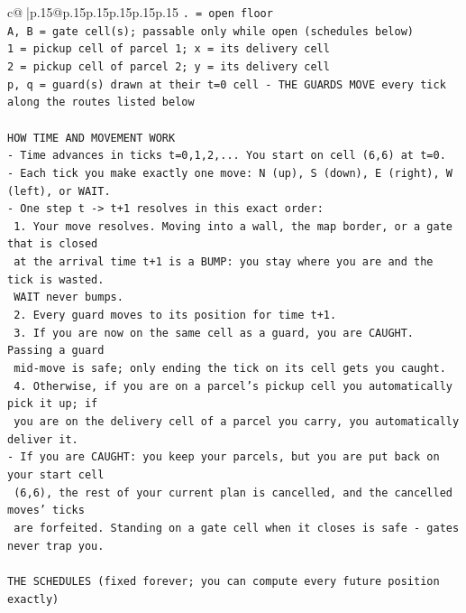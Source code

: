 \documentclass{article}
\begin{document}
{\begin{supertabular}{c@{$\;$}|p{.15\linewidth}@{}p{.15\linewidth}p{.15\linewidth}p{.15\linewidth}p{.15\linewidth}p{.15\linewidth}}
{{{\texttt{. = open floor} \\
\texttt{A, B = gate cell(s); passable only while open (schedules below)} \\
\texttt{1 = pickup cell of parcel 1; x = its delivery cell} \\
\texttt{2 = pickup cell of parcel 2; y = its delivery cell} \\
\texttt{p, q = guard(s) drawn at their t=0 cell {-} THE GUARDS MOVE every tick along the routes listed below} \\
\\ 
\texttt{HOW TIME AND MOVEMENT WORK} \\
\texttt{{-} Time advances in ticks t=0,1,2,... You start on cell (6,6) at t=0.} \\
\texttt{{-} Each tick you make exactly one move: N (up), S (down), E (right), W (left), or WAIT.} \\
\texttt{{-} One step t {-}> t+1 resolves in this exact order:} \\
\texttt{  1. Your move resolves. Moving into a wall, the map border, or a gate that is closed} \\
\texttt{     at the arrival time t+1 is a BUMP: you stay where you are and the tick is wasted.} \\
\texttt{     WAIT never bumps.} \\
\texttt{  2. Every guard moves to its position for time t+1.} \\
\texttt{  3. If you are now on the same cell as a guard, you are CAUGHT. Passing a guard} \\
\texttt{     mid{-}move is safe; only ending the tick on its cell gets you caught.} \\
\texttt{  4. Otherwise, if you are on a parcel's pickup cell you automatically pick it up; if} \\
\texttt{     you are on the delivery cell of a parcel you carry, you automatically deliver it.} \\
\texttt{{-} If you are CAUGHT: you keep your parcels, but you are put back on your start cell} \\
\texttt{  (6,6), the rest of your current plan is cancelled, and the cancelled moves' ticks} \\
\texttt{  are forfeited. Standing on a gate cell when it closes is safe {-} gates never trap you.} \\
\\ 
\texttt{THE SCHEDULES (fixed forever; you can compute every future position exactly)} \\
}}}
\end{supertabular}}
\end{document}
